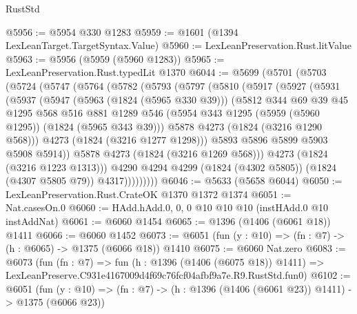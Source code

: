 \begin{lexlean}{RustStd}
\begin{coremodule}
@5956 := @5954 @330 @1283
@5959 := @1601 (@1394 LexLeanTarget.TargetSyntax.Value)
@5960 := LexLeanPreservation.Rust.litValue
@5963 := @5956 (@5959 (@5960 @1283))
@5965 := LexLeanPreservation.Rust.typedLit @1370
@6044 := @5699
    (@5701
      (@5703
        (@5724
          (@5747
            (@5764
              (@5782
                (@5793
                  (@5797
                    (@5810
                      (@5917
                        (@5927
                          (@5931
                            (@5937
                              (@5947
                                (@5963 (@1824 (@5965 @330 @39)))
                                (@5812
                                  @344
                                  @69
                                  @39
                                  @45
                                  @1295
                                  @568
                                  @516
                                  @881
                                  @1289
                                  @546
                                  (@5954 @343 @1295 (@5959 (@5960 @1295)) (@1824 (@5965 @343 @39)))
                                  @5878
                                  @4273
                                  (@1824 (@3216 @1290 @568)))
                                @4273
                                (@1824 (@3216 @1277 @1298)))
                              @5893
                              @5896
                              @5899
                              @5903
                              @5908
                              @5914))
                          @5878
                          @4273
                          (@1824 (@3216 @1269 @568)))
                        @4273
                        (@1824 (@3216 @1223 @1313)))
                      @4290
                      @4294
                      @4299
                      (@1824 (@4302 @5805))
                      (@1824 (@4307 @5805 @79))
                      @4317)))))))))
@6046 := @5633 (@5658 @6044)
@6050 := LexLeanPreservation.Rust.CrateOK @1370 @1372 @1374
@6051 := Nat.casesOn.{0}
@6060 := HAdd.hAdd.{0, 0, 0} @10 @10 @10 (instHAdd.{0} @10 instAddNat)
@6061 := @6060 @1454
@6065 := @1396 (@1406 (@6061 @18)) @1411
@6066 := @6060 @1452
@6073 := @6051 (fun (y : @10) => (fn : @7) -> (h : @6065) -> @1375 (@6066 @18)) @1410
@6075 := @6060 Nat.zero
@6083 := @6073
    (fun (fn : @7) =>
    fun (h : @1396 (@1406 (@6075 @18)) @1411) =>
    LexLeanPreserve.C931e4167009d4f69c76fcf04afbf9a7e.R9.RustStd.fun0)
@6102 := @6051
    (fun (y : @10) => (fn : @7) -> (h : @1396 (@1406 (@6061 @23)) @1411) -> @1375 (@6066 @23))

\end{coremodule}
\end{lexlean}
